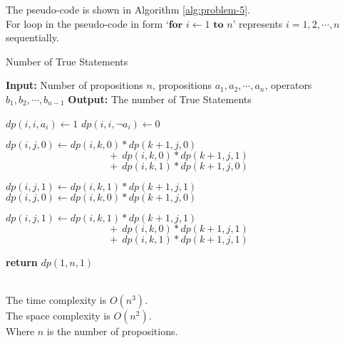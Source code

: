 The pseudo-code is shown in Algorithm \ref{alg:problem-5}.\\
For loop in the pseudo-code in form `$\textbf{for } i \gets 1 \textbf{ to } n$' represents $i=1,2,\cdots,n$ sequentially.
\begin{algorithm}
    \caption{Number of True Statements}
    \begin{algorithmic}[1]
    \State \textbf{Input:} Number of propositions $n$, propositions $a_1,a_2,\cdots,a_n$, operators $b_1,b_2,\cdots,b_{n-1}$
    \State \textbf{Output:} The number of True Statements

        \State $dp(i,i,a_i) \gets 1$
        \State $dp(i,i,\neg a_i) \gets 0$
    \EndFor
    
                    \State $dp(i,j,0) \gets dp(i,k,0) * dp(k+1,j,0)$
                    \Statex $\quad\quad\quad\quad\quad\quad\quad\quad\quad\quad\  +\ dp(i,k,0) * dp(k+1,j,1)$
                    \Statex $\quad\quad\quad\quad\quad\quad\quad\quad\quad\quad\  +\ dp(i,k,1) * dp(k+1,j,0)$
                    
                    \State $dp(i,j,1) \gets dp(i,k,1)*dp(k+1,j,1)$
                \Else
                    \State $dp(i,j,0) \gets dp(i,k,0) * dp(k+1,j,0)$
                    
                    \State $dp(i,j,1) \gets dp(i,k,1)*dp(k+1,j,1)$
                    \Statex $\quad\quad\quad\quad\quad\quad\quad\quad\quad\quad\  +\ dp(i,k,0) * dp(k+1,j,1)$
                    \Statex $\quad\quad\quad\quad\quad\quad\quad\quad\quad\quad\  +\ dp(i,k,1) * dp(k+1,j,1)$
                    
                    \EndIf
            \EndFor
        \EndFor
    \EndFor

    \State \textbf{return} $dp(1,n,1)$
    \end{algorithmic}
    \label{alg:problem-5}
\end{algorithm}\\
The time complexity is $O(n^3)$.\\
The space complexity is $O(n^2)$.\\
Where $n$ is the number of propositions.\\

\newpage
